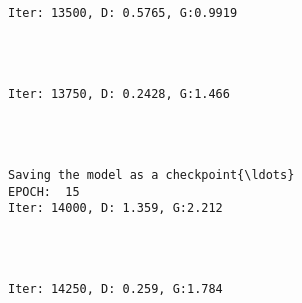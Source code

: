 \documentclass[11pt]{article}
\begin{document}
    \begin{center}
    \end{center}
    { \hspace*{\fill} \\}
    
    \begin{Verbatim}[commandchars=\\\{\}]

Iter: 13500, D: 0.5765, G:0.9919
    \end{Verbatim}

    \begin{center}
    \end{center}
    { \hspace*{\fill} \\}
    
    \begin{Verbatim}[commandchars=\\\{\}]

Iter: 13750, D: 0.2428, G:1.466
    \end{Verbatim}

    \begin{center}
    \end{center}
    { \hspace*{\fill} \\}
    
    \begin{Verbatim}[commandchars=\\\{\}]

Saving the model as a checkpoint{\ldots}
EPOCH:  15
Iter: 14000, D: 1.359, G:2.212
    \end{Verbatim}

    \begin{center}
    \end{center}
    { \hspace*{\fill} \\}
    
    \begin{Verbatim}[commandchars=\\\{\}]

Iter: 14250, D: 0.259, G:1.784
    \end{Verbatim}
\end{document}
